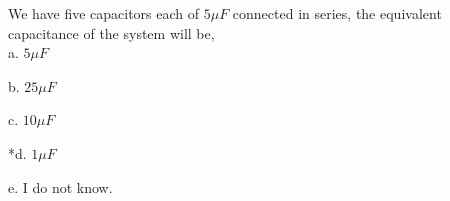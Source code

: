 
We have five capacitors each of \( 5 \mu F \) connected in series, the equivalent capacitance of the system will be,\\

a. \( 5 \mu F \) 

b. \( 25 \mu F \)

c. \( 10 \mu F \) 

*d. \( 1 \mu F \)

e. I do not know.\\
